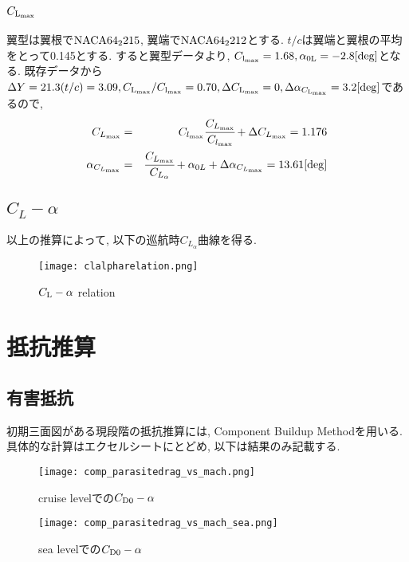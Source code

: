 \documentclass[12pt]{jsarticle}
\begin{document}
\subsection{$C_{\rm L_{max}}$}
翼型は翼根で$\rm NACA64_2 215$, 翼端で$\rm NACA64_2 212$とする. $t/c$は翼端と翼根の平均をとって0.145とする. すると翼型データより, $C_{\rm l_{ max}} = 1.68, \alpha_{\rm 0L} = -2.8[{\rm deg}]$となる. 既存データから$\Delta Y = 21.3(t/c) = 3.09, C_{\rm L_{max}}/C_{\rm l_{max}} = 0.70, \Delta C_{\rm L_{max}} = 0, \Delta\alpha_{C_{\rm L_{max}}} = 3.2[{\rm deg}]$であるので, 
\begin{eqnarray*}
C_{L_{\rm max}} &=& C_{l_{\rm max}}\cfrac{C_{L_{\rm max}}}{C_{l_{\rm max}}} + \Delta C_{L_{\rm max}} =  1.176\\
\alpha_{C_{L_{\rm max}}} &=& \cfrac{C_{L_{\rm max}}}{C_{L_{\alpha}}} + \alpha_{0L} + \Delta\alpha_{C_{L_{\rm max}}} = 13.61[{\rm deg}]
\end{eqnarray*}

\subsection{$C_L - \alpha$}
以上の推算によって, 以下の巡航時$C_{L_{\alpha}}$曲線を得る.
\begin{figure}[H]
\begin{center}
\texttt{[image: clalpharelation.png]}
\caption{$C_{\rm L}-\alpha$ relation}
\end{center}
\end{figure}

\section{抵抗推算}
\subsection{有害抵抗}
初期三面図がある現段階の抵抗推算には, Component Buildup Methodを用いる. 具体的な計算はエクセルシートにとどめ, 以下は結果のみ記載する.
\begin{figure}[H]
 \begin{minipage}{0.5\hsize}
  \begin{center}
   \texttt{[image: comp\_parasitedrag\_vs\_mach.png]}
  \end{center}
  \caption{cruise levelでの$C_{\rm D0} - \alpha$}
  \label{fig:one}
 \end{minipage}
 \begin{minipage}{0.5\hsize}
  \begin{center}
   \texttt{[image: comp\_parasitedrag\_vs\_mach\_sea.png]}
  \end{center}
  \caption{sea levelでの$C_{\rm D0} - \alpha$}
  \label{fig:two}
 \end{minipage}
\end{figure}
\end{document}
